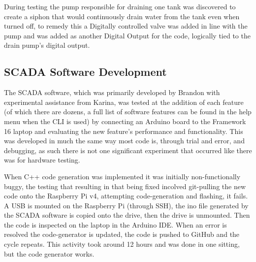 \documentclass[../main.tex]{subfiles}
\begin{document}
During testing the pump responsible for draining one tank was discovered to create a siphon that would continuously drain water from the tank even when turned off, to remedy this a Digitally controlled valve was added in line with the pump and was added as another Digital Output for the code, logically tied to the drain pump’s digital output.

\subsection{SCADA Software Development}
The SCADA software, which was primarily developed by Brandon with experimental assistance from Karina, was tested at the addition of each feature (of which there are dozens, a full list of software features can be found in the help menu when the CLI is used) by connecting an Arduino board to the Framework 16 laptop and evaluating the new feature's performance and functionality. This was developed in much the same way most code is, through trial and error, and debugging, as such there is not one significant experiment that occurred like there was for hardware testing.

When C++ code generation was implemented it was initially non-functionally buggy, the testing that resulting in that being fixed incolved git-pulling the new code onto the Raspberry Pi v4, attempting code-generation and flashing, it fails. A USB is mounted on the Raspberry Pi (through SSH), the ino file generated by the SCADA software is copied onto the drive, then the drive is unmounted. Then the code is inspected on the laptop in the Arduino IDE. When an error is resolved the code-generator is updated, the code is pushed to GitHub and the cycle repeats. This activity took around 12 hours and was done in one sitting, but the code generator works.
\end{document}
